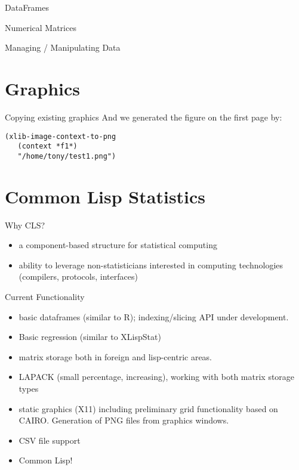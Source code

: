 \documentclass{beamer}
\begin{document}
\begin{frame}[verbatim]{DataFrames}
  
\end{frame}

\begin{frame}[verbatim]{Numerical Matrices}
  
\end{frame}

\begin{frame}{Managing / Manipulating Data}
  
\end{frame}



\section{Graphics}
\label{sec:practice}



\begin{frame}[fragile]{Copying existing graphics}
  And we generated the figure on the first page by:
\begin{verbatim}
(xlib-image-context-to-png
   (context *f1*)
   "/home/tony/test1.png")
\end{verbatim}
\end{frame}


\section{Common Lisp Statistics}

\begin{frame}{Why CLS?}
  \begin{itemize}
  \item a component-based structure for statistical computing
  \item ability to leverage non-statisticians interested in computing
    technologies (compilers, protocols, interfaces)
  \end{itemize}
\end{frame}

\begin{frame}{Current Functionality}
  \begin{itemize}
  \item basic dataframes (similar to R); indexing/slicing API under
    development. 
  \item Basic regression (similar to XLispStat)
  \item matrix storage both in foreign and lisp-centric areas.
  \item LAPACK (small percentage, increasing), working with both
    matrix storage types
  \item static graphics (X11) including preliminary grid functionality based
    on CAIRO.  Generation of PNG files from graphics windows.
  \item CSV file support
  \item Common Lisp!
  \end{itemize}
\end{frame}
\end{document}
